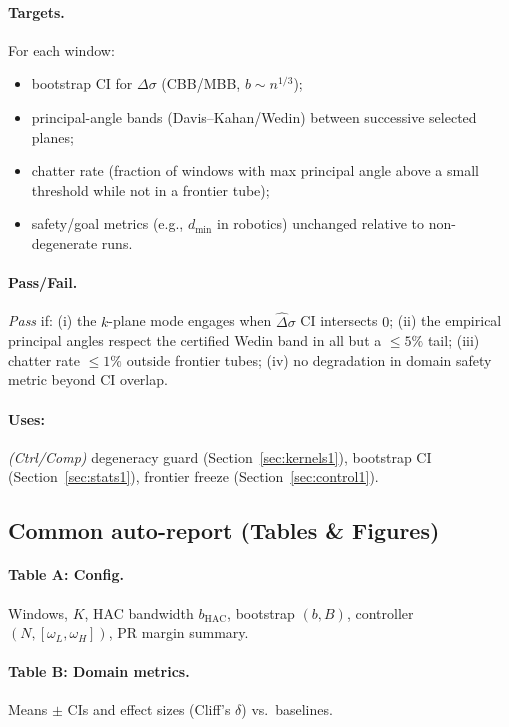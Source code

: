\paragraph{Targets.} For each window:
\begin{itemize}[leftmargin=*]
\item bootstrap CI for $\Delta\sigma$ (CBB/MBB, $b\sim n^{1/3}$);
\item principal-angle bands (Davis--Kahan/Wedin) between successive selected planes;
\item chatter rate (fraction of windows with max principal angle above a small threshold while not in a frontier tube);
\item safety/goal metrics (e.g., $d_{\min}$ in robotics) unchanged relative to non-degenerate runs.
\end{itemize}

\paragraph{Pass/Fail.} \emph{Pass} if: (i) the $k$-plane mode engages when $\widehat\Delta\sigma$ CI intersects $0$; (ii) the empirical principal angles respect the certified Wedin band in all but a $\le 5\%$ tail; (iii) chatter rate $\le 1\%$ outside frontier tubes; (iv) no degradation in domain safety metric beyond CI overlap.

\paragraph{Uses:} \textit{(Ctrl/Comp)} degeneracy guard (Section~\ref{sec:kernels1}), bootstrap CI (Section~\ref{sec:stats1}), frontier freeze (Section~\ref{sec:control1}).

\subsection{Common auto-report (Tables \& Figures)}\label{subsec:auto-report}

\paragraph{Table A: Config.} Windows, $K$, HAC bandwidth $b_{\mathrm{HAC}}$, bootstrap $(b,B)$, controller $(N,[\omega_L,\omega_H])$, PR margin summary.

\paragraph{Table B: Domain metrics.} Means $\pm$ CIs and effect sizes (Cliff's $\delta$) vs.\ baselines.

